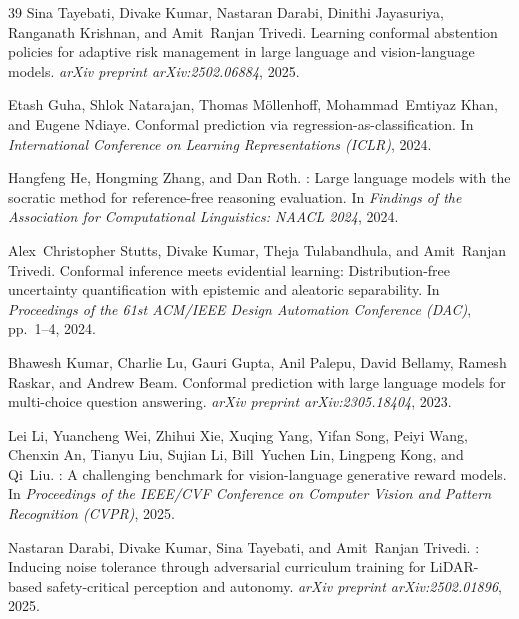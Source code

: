 \documentclass{article}
\begin{document}
\begin{thebibliography}{39}
Sina Tayebati, Divake Kumar, Nastaran Darabi, Dinithi Jayasuriya, Ranganath Krishnan, and Amit~Ranjan Trivedi.
\newblock Learning conformal abstention policies for adaptive risk management in large language and vision-language models.
\newblock \emph{arXiv preprint arXiv:2502.06884}, 2025{}.

Etash Guha, Shlok Natarajan, Thomas M{\"o}llenhoff, Mohammad~Emtiyaz Khan, and Eugene Ndiaye.
\newblock Conformal prediction via regression-as-classification.
\newblock In \emph{International Conference on Learning Representations (ICLR)}, 2024.

Hangfeng He, Hongming Zhang, and Dan Roth.
: Large language models with the socratic method for reference-free reasoning evaluation.
\newblock In \emph{Findings of the Association for Computational Linguistics: NAACL 2024}, 2024.

Alex~Christopher Stutts, Divake Kumar, Theja Tulabandhula, and Amit~Ranjan Trivedi.
\newblock Conformal inference meets evidential learning: Distribution-free uncertainty quantification with epistemic and aleatoric separability.
\newblock In \emph{Proceedings of the 61st ACM/IEEE Design Automation Conference (DAC)}, pp.\  1--4, 2024.

Bhawesh Kumar, Charlie Lu, Gauri Gupta, Anil Palepu, David Bellamy, Ramesh Raskar, and Andrew Beam.
\newblock Conformal prediction with large language models for multi-choice question answering.
\newblock \emph{arXiv preprint arXiv:2305.18404}, 2023.

Lei Li, Yuancheng Wei, Zhihui Xie, Xuqing Yang, Yifan Song, Peiyi Wang, Chenxin An, Tianyu Liu, Sujian Li, Bill~Yuchen Lin, Lingpeng Kong, and Qi~Liu.
: A challenging benchmark for vision-language generative reward models.
\newblock In \emph{Proceedings of the IEEE/CVF Conference on Computer Vision and Pattern Recognition (CVPR)}, 2025.

Nastaran Darabi, Divake Kumar, Sina Tayebati, and Amit~Ranjan Trivedi.
: Inducing noise tolerance through adversarial curriculum training for {LiDAR}-based safety-critical perception and autonomy.
\newblock \emph{arXiv preprint arXiv:2502.01896}, 2025.


\end{thebibliography}
\end{document}
